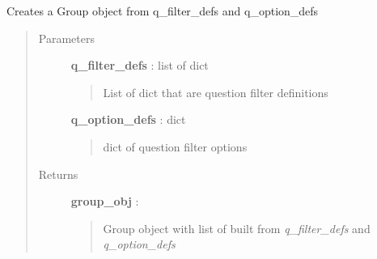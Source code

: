 \documentclass[letterpaper,10pt,english]{sphinxmanual}
\begin{document}
\begin{fulllineitems}
\label{pytan.utils:pytan.utils.build_group_obj}
Creates a Group object from q\_filter\_defs and q\_option\_defs
\begin{quote}\begin{description}
\item[{Parameters}] \leavevmode
\textbf{q\_filter\_defs} : list of dict
\begin{quote}

List of dict that are question filter definitions
\end{quote}

\textbf{q\_option\_defs} : dict
\begin{quote}

dict of question filter options
\end{quote}

\item[{Returns}] \leavevmode
\textbf{group\_obj} : {\hyperref[taniumpy.object_types:taniumpy.object_types.group.Group]{}}
\begin{quote}

Group object with list of {\hyperref[taniumpy.object_types:taniumpy.object_types.filter.Filter]{}} built from \emph{q\_filter\_defs} and \emph{q\_option\_defs}
\end{quote}

\end{description}\end{quote}

\end{fulllineitems}

\end{document}
